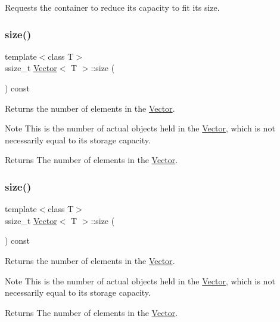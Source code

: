 Requests the container to reduce its capacity to fit its size. \mbox{\label{classVector_a0fee6dcc9febf5495fac43009213bdc8}} 
\subsubsection{\texorpdfstring{size()}{size()}\hspace{0.1cm}{\footnotesize\ttfamily [1/2]}}
{\footnotesize\ttfamily template$<$class T$>$ \\
ssize\+\_\+t \hyperlink{classVector}{Vector}$<$ T $>$\+::size (\begin{DoxyParamCaption}{ }\end{DoxyParamCaption}) const\hspace{0.3cm}{\ttfamily [inline]}}



Returns the number of elements in the \hyperlink{classVector}{Vector}. 

\begin{DoxyNote}{Note}
This is the number of actual objects held in the \hyperlink{classVector}{Vector}, which is not necessarily equal to its storage capacity. 
\end{DoxyNote}
\begin{DoxyReturn}{Returns}
The number of elements in the \hyperlink{classVector}{Vector}. 
\end{DoxyReturn}
\mbox{\label{classVector_a0fee6dcc9febf5495fac43009213bdc8}} 
\subsubsection{\texorpdfstring{size()}{size()}\hspace{0.1cm}{\footnotesize\ttfamily [2/2]}}
{\footnotesize\ttfamily template$<$class T$>$ \\
ssize\+\_\+t \hyperlink{classVector}{Vector}$<$ T $>$\+::size (\begin{DoxyParamCaption}{ }\end{DoxyParamCaption}) const\hspace{0.3cm}{\ttfamily [inline]}}



Returns the number of elements in the \hyperlink{classVector}{Vector}. 

\begin{DoxyNote}{Note}
This is the number of actual objects held in the \hyperlink{classVector}{Vector}, which is not necessarily equal to its storage capacity. 
\end{DoxyNote}
\begin{DoxyReturn}{Returns}
The number of elements in the \hyperlink{classVector}{Vector}. 
\end{DoxyReturn}
\mbox{\label{classVector_a7a46eb16510bb61368d2635d677a9c93}} 
